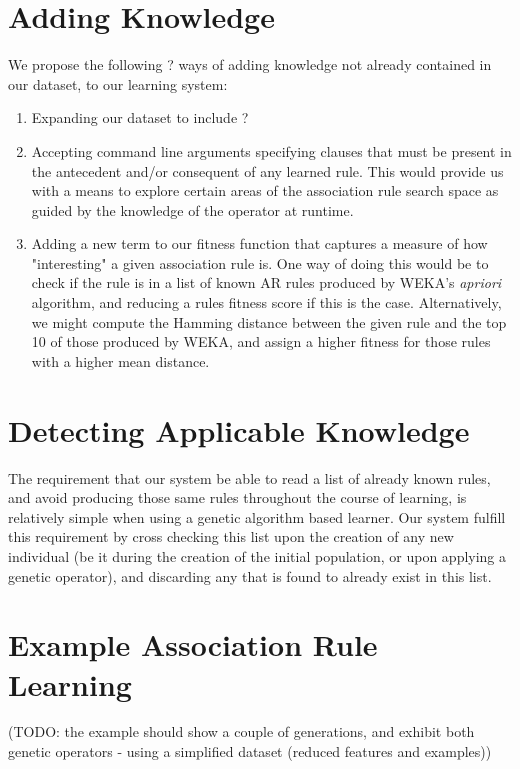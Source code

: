 \documentclass{amsart}
\theoremstyle{definition}
\theoremstyle{remark}
\numberwithin{equation}{section}
\begin{document}
\section{Adding Knowledge}

We propose the following ? ways of adding knowledge not already contained in our dataset, to our learning system:

\begin{enumerate}
	\item Expanding our dataset to include ? 
	\item Accepting command line arguments specifying clauses that must be present in the antecedent and/or consequent of any learned rule. This would provide us with a means to explore certain areas of the association rule search space as guided by the knowledge of the operator at runtime. 
	\item Adding a new term to our fitness function that captures a measure of how "interesting" a given association rule is. One way of doing this would be to check if the rule is in a list of known AR rules produced by WEKA's \textit{apriori} algorithm, and reducing a rules fitness score if this is the case. Alternatively, we might compute the Hamming distance between the given rule and the top 10 of those produced by WEKA, and assign a higher fitness for those rules with a higher mean distance. 
\end{enumerate}

\section{Detecting Applicable Knowledge}

The requirement that our system be able to read a list of already known rules, and avoid producing those same rules throughout the course of learning, is relatively simple when using a genetic algorithm based learner. Our system fulfill this requirement by cross checking this list upon the creation of any new individual (be it during the creation of the initial population, or upon applying a genetic operator), and discarding any that is found to already exist in this list. 

\section{Example Association Rule Learning}

(TODO: the example should show a couple of generations, and exhibit both genetic operators - using a simplified dataset (reduced features and examples))



\end{document}
